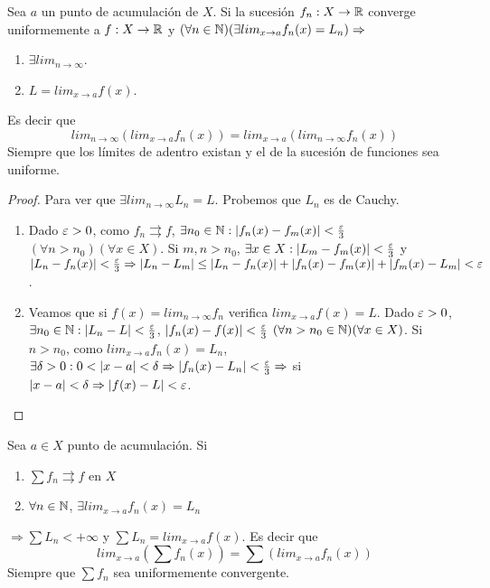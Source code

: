\begin{theorem}
  Sea $a$ un punto de acumulación de $X$. Si la sucesión $f_n: X \to \mathbb{R}$ converge uniformemente a $f: X \to \mathbb{R}$ y $(\forall n \in \mathbb{N})(\exists lim_{x \to a} f_n(x) = L_n) \Rightarrow$
  \begin{enumerate}
    \item $\exists lim_{n \to \infty}$.
    \item $L = lim_{x \to a} f(x)$.
  \end{enumerate}
  Es decir que \begin{equation}
    lim_{n \to \infty}(lim_{x \to a} f_n(x)) = lim_{x \to a}(lim_{n \to \infty} f_n(x))
  \end{equation}
  Siempre que los límites de adentro existan y el de la sucesión de funciones sea uniforme.

  \begin{proof}
    Para ver que $\exists lim_{n \to \infty} L_n = L$. Probemos que $L_n$ es de Cauchy.
    \begin{enumerate}
      \item Dado $\varepsilon > 0$, como $f_n \rightrightarrows f$, $\exists n_0 \in \mathbb{N} : |f_n(x) - f_m(x)| < \frac{\varepsilon}{3}$ $(\forall n > n_0)(\forall x \in X)$. Si $m,n > n_0$, $\exists x \in X : |L_m - f_m(x)| < \frac{\varepsilon}{3}$ y $|L_n - f_n(x)| < \frac{\varepsilon}{3} \Rightarrow |L_n - L_m| \leq |L_n - f_n(x)| + |f_n(x) - f_m(x)| + |f_m(x) - L_m| < \varepsilon$.
      \item Veamos que si $f(x) = lim_{n \to \infty} f_n$ verifica $lim_{x \to a} f(x) = L$. Dado $\varepsilon > 0$, $\exists n_0 \in \mathbb{N} : |L_n - L| < \frac{\varepsilon}{3}$, $|f_n(x) - f(x)| < \frac{\varepsilon}{3}$ $(\forall n > n_0 \in \mathbb{N})(\forall x \in X)$. Si $n > n_0$, como $lim_{x \to a} f_n(x) = L_n$, $\exists \delta > 0 : 0 < |x-a| < \delta \Rightarrow |f_n(x) - L_n| < \frac{\varepsilon}{3} \Rightarrow$ si $|x-a| < \delta \Rightarrow |f(x) - L| < \varepsilon$. 
    \end{enumerate}
  \end{proof}
\end{theorem}

\begin{corollary}
  Sea $a \in X$ punto de acumulación. Si \begin{enumerate}
    \item $\sum f_n \rightrightarrows f$ en $X$
    \item $\forall n \in \mathbb{N}$, $\exists lim_{x \to a} f_n(x) = L_n$
  \end{enumerate} $\Rightarrow \sum L_n < +\infty$ y $\sum L_n = lim_{x \to a} f(x)$.
  Es decir que \begin{equation}
    lim_{x \to a}(\sum f_n(x)) = \sum(lim_{x \to a} f_n(x))
  \end{equation} Siempre que $\sum f_n$ sea uniformemente convergente.
\end{corollary}

